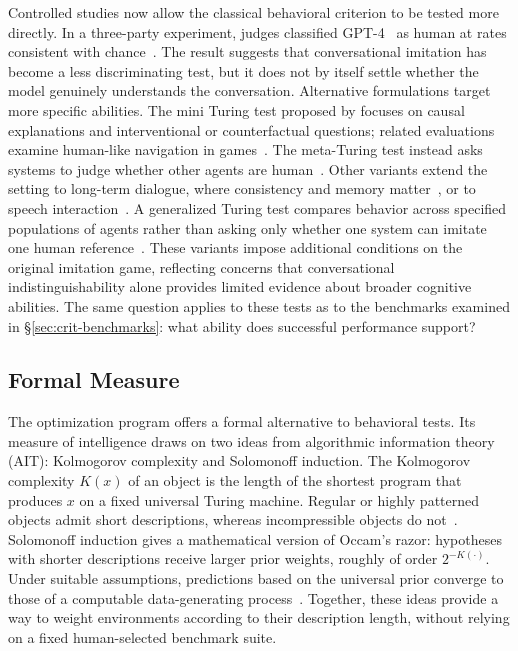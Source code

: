 \documentclass[acmsmall,screen,review,anonymous]{acmart}
\begin{document}
Controlled studies now allow the classical behavioral criterion to be tested more directly.
%
In a three-party experiment, judges classified GPT-4~\citep{openai2024gpt4technicalreport} as human at rates consistent with chance~\citep{10.1145/3715275.3732108,Jones2026}.
%
The result suggests that conversational imitation has become a less discriminating test, but it does not by itself settle whether the model genuinely understands the conversation.
%
Alternative formulations target more specific abilities.
%
The mini Turing test proposed by \citet{pearl2018, 10.1145/1283920.2351636} focuses on causal explanations and interventional or counterfactual questions; related evaluations examine human-like navigation in games~\citep{pmlr-v139-devlin21a}.
%
The meta-Turing test instead asks systems to judge whether other agents are human~\citep{walsh2022metaturingtest}. 
%
Other variants extend the setting to long-term dialogue, where consistency and memory matter~\citep{wu-etal-2025-xturing}, or to speech interaction~\citep{li2026human}.
%
A generalized Turing test compares behavior across specified populations of agents rather than asking only whether one system can imitate one human reference~\citep{mitropolsky2026generalizedturingtestfoundation}.
%
These variants impose additional conditions on the original imitation game, reflecting concerns that conversational indistinguishability alone provides limited evidence about broader cognitive abilities.
%
The same question applies to these tests as to the benchmarks examined in \S\ref{sec:crit-benchmarks}: what ability does successful performance support?


\subsection{Formal Measure}
\label{sec:formalmeasure}
The optimization program offers a formal alternative to behavioral tests.
%
Its measure of intelligence draws on two ideas from algorithmic information theory (AIT): Kolmogorov complexity and Solomonoff induction.
%
The Kolmogorov complexity $K(x)$ of an object is the length of the shortest program that produces $x$ on a fixed universal Turing machine.
%
Regular or highly patterned objects admit short descriptions, whereas incompressible objects do not~\citep{Kolmogorov1968ThreeAT}. 
%
Solomonoff induction gives a mathematical version of Occam's razor: hypotheses with shorter descriptions receive larger prior weights, roughly of order $2^{-K(\cdot)}$.
%
Under suitable assumptions, predictions based on the universal prior converge to those of a computable data-generating process~\citep{Solomonoff1964AFT1, Solomonoff1964AFT2}.
%
Together, these ideas provide a way to weight environments according to their description length, without relying on a fixed human-selected benchmark suite. 
\end{document}
